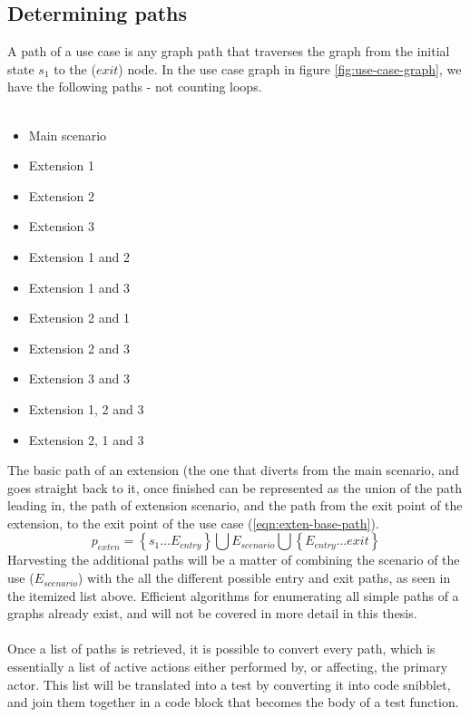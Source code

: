 \subsection{Determining paths}
\label{ssec:use-case-paths}
A path of a use case is any graph path that traverses the graph from the initial state $s_1$ to the ($exit$) node. In the use case graph in figure \ref{fig:use-case-graph}, we have the following paths - not counting loops.\\\\
\begin{itemize}
  \item Main scenario
  \item Extension 1
  \item Extension 2
  \item Extension 3
  \item Extension 1 and 2
  \item Extension 1 and 3  
  \item Extension 2 and 1
  \item Extension 2 and 3  
  \item Extension 3 and 3
  \item Extension 1, 2 and 3
  \item Extension 2, 1 and 3
\end{itemize}
\noindent The basic path of an extension (the one that diverts from the main scenario, and goes straight back to it, once finished can be represented as the union of the path leading in, the path of extension scenario, and the path from the exit point of the extension, to the exit point of the use case (\ref{eqn:exten-base-path}). 
\begin{equation}
p_{exten} = \left\lbrace s_1 \dots E_{entry} \right\rbrace \bigcup E_{scenario} \bigcup \left\lbrace E_{entry} \dots exit \right\rbrace
\label{eqn:exten-base-path}
\end{equation}
Harvesting the additional paths will be a matter of combining the scenario of the use ($E_{scenario}$) with the all the different possible entry and exit paths, as seen in the itemized list above. Efficient algorithms for enumerating all simple paths of a graphs already exist\cite{rubin1978enumerating}, and will not be covered in more detail in this thesis.\\\\
Once a list of paths is retrieved, it is possible to convert every path, which is essentially a list of active actions either performed by, or affecting, the primary actor. This list will be translated into a test by converting it into code snibblet, and join them together in a code block that becomes the body of a test function.\\\\
